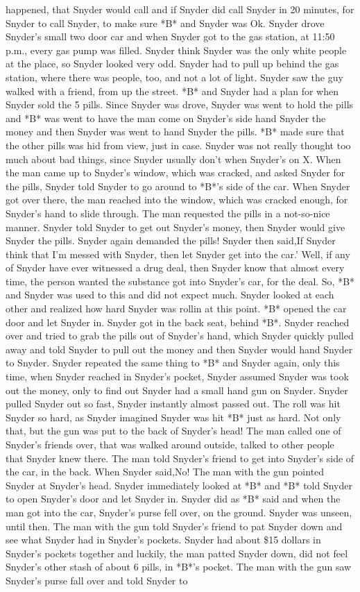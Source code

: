 \documentclass[12pt]{book}
\begin{document}
happened, that Snyder would call and if Snyder did call Snyder in 20 minutes, for Snyder to call Snyder, to make sure *B* and Snyder was Ok. Snyder drove Snyder's small two door car and when Snyder got to the gas station, at 11:50 p.m., every gas pump was filled. Snyder think Snyder was the only white people at the place, so Snyder looked very odd. Snyder had to pull up behind the gas station, where there was people, too, and not a lot of light. Snyder saw the guy walked with a friend, from up the street. *B* and Snyder had a plan for when Snyder sold the 5 pills. Since Snyder was drove, Snyder was went to hold the pills and *B* was went to have the man come on Snyder's side hand Snyder the money and then Snyder was went to hand Snyder the pills. *B* made sure that the other pills was hid from view, just in case. Snyder was not really thought too much about bad things, since Snyder usually don't when Snyder's on X. When the man came up to Snyder's window, which was cracked, and asked Snyder for the pills, Snyder told Snyder to go around to *B*'s side of the car. When Snyder got over there, the man reached into the window, which was cracked enough, for Snyder's hand to slide through. The man requested the pills in a not-so-nice manner. Snyder told Snyder to get out Snyder's money, then Snyder would give Snyder the pills. Snyder again demanded the pills! Snyder then said,If Snyder think that I'm messed with Snyder, then let Snyder get into the car.' Well, if any of Snyder have ever witnessed a drug deal, then Snyder know that almost every time, the person wanted the substance got into Snyder's car, for the deal. So, *B* and Snyder was used to this and did not expect much. Snyder looked at each other and realized how hard Snyder was rollin at this point. *B* opened the car door and let Snyder in. Snyder got in the back seat, behind *B*. Snyder reached over and tried to grab the pills out of Snyder's hand, which Snyder quickly pulled away and told Snyder to pull out the money and then Snyder would hand Snyder to Snyder. Snyder repeated the same thing to *B* and Snyder again, only this time, when Snyder reached in Snyder's pocket, Snyder assumed Snyder was took out the money, only to find out Snyder had a small hand gun on Snyder. Snyder pulled Snyder out so fast, Snyder instantly almost passed out. The roll was hit Snyder so hard, as Snyder imagined Snyder was hit *B* just as hard. Not only that, but the gun was put to the back of Snyder's head! The man called one of Snyder's friends over, that was walked around outside, talked to other people that Snyder knew there. The man told Snyder's friend to get into Snyder's side of the car, in the back. When Snyder said,No! The man with the gun pointed Snyder at Snyder's head. Snyder immediately looked at *B* and *B* told Snyder to open Snyder's door and let Snyder in. Snyder did as *B* said and when the man got into the car, Snyder's purse fell over, on the ground. Snyder was unseen, until then. The man with the gun told Snyder's friend to pat Snyder down and see what Snyder had in Snyder's pockets. Snyder had about \$15 dollars in Snyder's pockets together and luckily, the man patted Snyder down, did not feel Snyder's other stash of about 6 pills, in *B*'s pocket. The man with the gun saw Snyder's purse fall over and told Snyder to 
\end{document}
